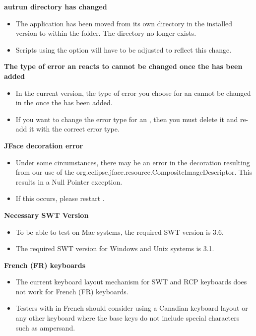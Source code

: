 \textbf{autrun directory has changed}\\
\begin{itemize}
\item The  application has been moved from its own directory in the installed version to within the  folder. The  
directory no longer exists.
\item Scripts using the  option will have to be adjusted to reflect this change.
\end{itemize}

\textbf{The type of error an \gdehandler{} reacts to cannot be changed once the \gdehandler{} has been added}\\
\begin{itemize}
\item  In the current version, the type of error you choose for an \gdehandler{} cannot be changed in the \gdpropview{} once the \gdehandler{} has been added.
\item If you want to change the error type for an \gdehandler{}, then you must delete it and re-add it with the correct error type. 
\end{itemize}

\textbf{JFace decoration error}\\
\begin{itemize}
\item Under some circumstances, there may be an error in the decoration resulting from our use of the org.eclipse.jface.resource.CompositeImageDescriptor. This results in a Null Pointer exception.
\item If this occurs, please restart \app{}.
\end{itemize}


\textbf{Necessary SWT Version}\\
\begin{itemize}
\item To be able to test \gdauts{} on Mac systems, the required SWT version is 3.6. 
\item The required SWT version for Windows and Unix systems is 3.1.
\end{itemize}


\textbf{French (FR) keyboards}\\
\begin{itemize}
\item The current keyboard layout mechanism for SWT and RCP keyboards does not work for French (FR) keyboards.
\item Testers with \gdauts{} in French should consider using a Canadian keyboard layout or any other keyboard where the 
base keys do not include special characters such as ampersand.
\end{itemize}
